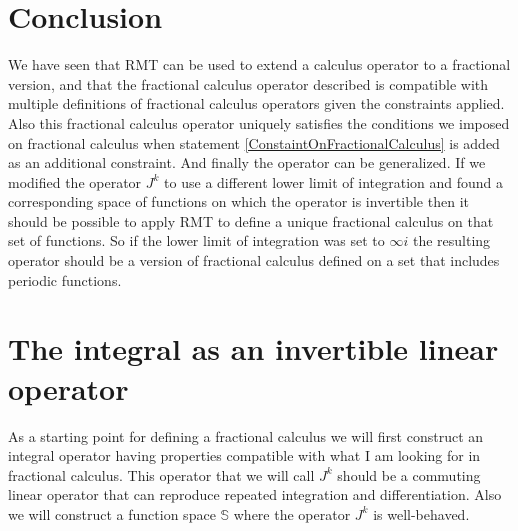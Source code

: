 \documentclass[%
 onecolumn,
 amsmath, amssymb, aps, pra, 10pt
]{revtex4-2}
\begin{document}
\section{Conclusion}
We have seen that RMT can be used to extend a calculus operator to a fractional version, and that the fractional calculus operator described is compatible with multiple definitions of fractional calculus operators given the constraints applied. Also this fractional calculus operator uniquely satisfies the conditions we imposed on fractional calculus when statement \eqref{ConstaintOnFractionalCalculus} is added as an additional constraint. And finally the operator can be generalized. If we modified the operator $J^k$ to use a different lower limit of integration and found a corresponding space of functions on which the operator is invertible then it should be possible to apply RMT to define a unique fractional calculus on that set of functions. So if the lower limit of integration was set to $\infty i$ the resulting operator should be a version of fractional calculus defined on a set that includes periodic functions.

\clearpage

\appendix*
\section{The integral as an invertible linear operator}
As a starting point for defining a fractional calculus we will first construct an integral operator having properties compatible with what I am looking for in fractional calculus. This operator that we will call $J^k$ should be a commuting linear operator that can reproduce repeated integration and differentiation. Also we will construct a function space $\mathbb{S}$ where the operator $J^k$ is well-behaved.
\end{document}
